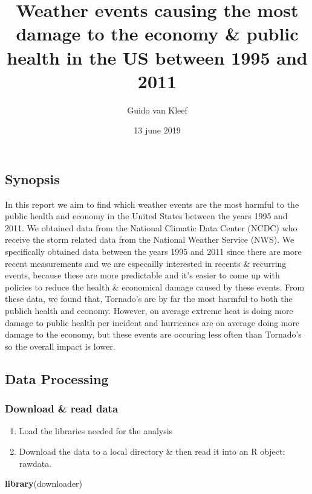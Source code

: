 \documentclass[]{article}
\title{Weather events causing the most damage to the economy \& public health
in the US between 1995 and 2011}
\author{Guido van Kleef}
\date{13 june 2019}
\newenvironment{Shaded}{\begin{snugshade}}{\end{snugshade}}
\newcommand{\KeywordTok}[1]{\textcolor[rgb]{0.13,0.29,0.53}{\textbf{#1}}}
\newcommand{\NormalTok}[1]{#1}
\providecommand{\tightlist}{%
  \setlength{\itemsep}{0pt}\setlength{\parskip}{0pt}}
\begin{document}
\maketitle

\subsection{Synopsis}\label{synopsis}

In this report we aim to find which weather events are the most harmful
to the public health and economy in the United States between the years
1995 and 2011. We obtained data from the National Climatic Data Center
(NCDC) who receive the storm related data from the National Weather
Service (NWS). We specifically obtained data between the years 1995 and
2011 since there are more recent measurements and we are especailly
interested in recents \& recurring events, because these are more
predictable and it's easier to come up with policies to reduce the
health \& economical damage caused by these events. From these data, we
found that, Tornado's are by far the most harmful to both the publich
health and economy. However, on average extreme heat is doing more
damage to public health per incident and hurricanes are on average doing
more damage to the economy, but these events are occuring less often
than Tornado's so the overall impact is lower.

\subsection{Data Processing}\label{data-processing}

\subsubsection{Download \& read data}\label{download-read-data}

\begin{enumerate}
\def\labelenumi{\arabic{enumi}.}
\tightlist
\item
  Load the libraries needed for the analysis
\item
  Download the data to a local directory \& then read it into an R
  object: rawdata.
\end{enumerate}

\begin{Shaded}
\begin{Highlighting}[]
\KeywordTok{library}\NormalTok{(downloader)}
\end{Highlighting}
\end{Shaded}
\end{document}
